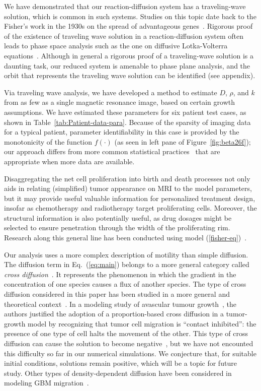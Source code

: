 \documentclass{aims}
\numberwithin{equation}{section}
\begin{document}
We have demonstrated that our reaction-diffusion system has a traveling-wave solution,
which is common in such systems.
Studies on this topic date back to the Fisher's work in the 1930s on the spread of
advantageous genes~\cite{Fisher1937}. Rigorous
proof of the existence of traveling wave solution in a reaction-diffusion
system often leads to phase space analysis such as the one on diffusive
Lotka-Volterra equations~\cite{Dunbar1983}.  Although in general a rigorous
proof of a traveling-wave solution is a daunting task, our reduced system is amenable to phase plane analysis, and the orbit that represents
the traveling wave solution can be identified (see appendix).

Via traveling wave analysis, we have developed a method to estimate $D$, $\rho$, and
$k$ from as few as a single magnetic resonance image, based on certain growth
assumptions. We have estimated these parameters for six
patient test cases, as shown in Table~\ref{tab:Patient-data-para}. Because of the
sparsity of imaging data for a typical patient,
parameter identifiability in this case is provided
by the monotonicity of the function  $f(\cdot)$ (as seen in left pane of
Figure~\ref{fig:beta26f});  our approach differs from more common statistical
practices~\cite{Eisenberg2017} that are appropriate when more data are available. 
   
Disaggregating the net cell proliferation into birth and death processes not only
aids in relating (simplified) tumor appearance on MRI to the model parameters, but
it may provide useful valuable information for personalized treatment
design, insofar as chemotherapy and radiotherapy target proliferating cells.
Moreover, the structural information is also potentially useful, as drug dosages
might be selected to ensure penetration through the width
of the proliferating rim. Research along this general line has been conducted using
model (\ref{fisher-eq})~\cite{Kim2017}.

Our analysis uses a more complex description of motility than simple diffusion.
The diffusion term in Eq.~(\ref{eq:main}) belongs to a more general category called
\emph{cross diffusion}~\cite{Madzvamuse2017}.  It represents the phenomenon in which
the gradient in the concentration of one species causes a flux
of another species.  The type of cross diffusion considered in this paper has been
studied in a more general and theoretical context~\cite{Sherratt2000}.  In a
modeling study of avascular tumour growth~\cite{Sherratt2001b}, the authors justified
the adoption of a proportion-based cross diffusion in a tumor-growth model by recognizing
that tumor cell migration is ``contact inhibited'':  the presence
of one type of cell halts the movement of the other. This type of cross diffusion
can cause the solution to become negative~\cite{Madzvamuse2017}, but we have not
encounted this difficulty so far in our numerical simulations.
We conjecture that, for suitable initial conditions,
solutions remain positive, which will be a topic for future study. 
Other types of density-dependent
diffusion have been considered in modeling GBM migration~\cite{Stepien2015}.
\end{document}
